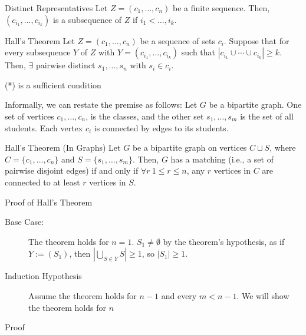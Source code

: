\documentclass[10pt]{extarticle}
\begin{document}
{\begin{problem}{Distinct Representatives}
    Let $Z = (c_1,\dots,c_n)$ be a finite sequence. Then, $(c_{i_1},\dots,c_{i_k})$ is a subsequence of $Z$ if $i_1<\dots,i_k$.
    \begin{problem}{Hall's Theorem}
      Let $Z = (c_1,\dots,c_n)$ be a sequence of sets $c_i$. Suppose that for every subsequence $Y$ of $Z$ with $Y = (c_{i_1},\dots,c_{i_k})$ such that $|c_{i_1} \cup \cdots \cup c_{i_k}| \geq k$. Then, $\exists$ pairwise distinct $s_1,\dots,s_n$ with $s_i\in c_i$.
      \begin{description}
        \tiny
        \item[Note] (*) is a sufficient condition
      \end{description}
    \end{problem}
      Informally, we can restate the premise as follows: Let $G$ be a bipartite graph. One set of vertices $c_1,\dots,c_n$, is the classes, and the other set $s_1,\dots,s_m$ is the set of all students. Each vertex $c_i$ is connected by edges to its students.
    \begin{problem}{Hall's Theorem (In Graphs)}
      Let $G$ be a bipartite graph on vertices $C\sqcup S$, where $C = \{c_1,\dots,c_n\}$ and $S = \{s_1,\dots,s_m\}$. Then, $G$ has a matching (i.e., a set of pairwise disjoint edges) if and only if $\forall r~1\leq r\leq n$, any $r$ vertices in $C$ are connected to at least $r$ vertices in $S$.
    \end{problem}
  \end{problem}
  \begin{problem}{Proof of Hall's Theorem}
    \begin{description}
      \item[Base Case:] The theorem holds for $n=1$. $S_1 \neq \emptyset$ by the theorem's hypothesis, as if $Y := (S_1)$, then $\left|\bigcup_{S\in Y}S\right| \geq 1$, so $|S_1| \geq 1$.
      \item[Induction Hypothesis] Assume the theorem holds for $n-1$ and every $m < n-1$. We will show the theorem holds for $n$
      \item[Proof]\hfill
\end{description}
\end{problem}}
\end{document}
